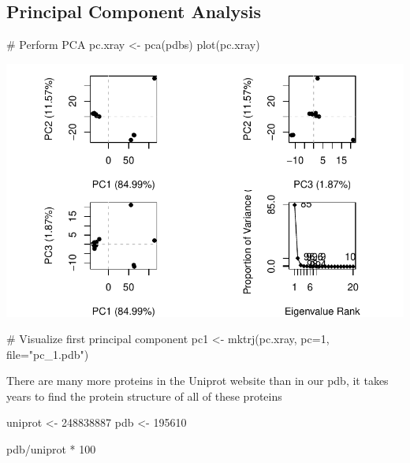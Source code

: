 \documentclass[
  letterpaper,
  DIV=11,
  numbers=noendperiod]{scrartcl}
\newenvironment{Shaded}{\begin{snugshade}}{\end{snugshade}}
\newcommand{\AttributeTok}[1]{\textcolor[rgb]{0.40,0.45,0.13}{#1}}
\newcommand{\CommentTok}[1]{\textcolor[rgb]{0.37,0.37,0.37}{#1}}
\newcommand{\DecValTok}[1]{\textcolor[rgb]{0.68,0.00,0.00}{#1}}
\newcommand{\FunctionTok}[1]{\textcolor[rgb]{0.28,0.35,0.67}{#1}}
\newcommand{\NormalTok}[1]{\textcolor[rgb]{0.00,0.23,0.31}{#1}}
\newcommand{\OtherTok}[1]{\textcolor[rgb]{0.00,0.23,0.31}{#1}}
\newcommand{\SpecialCharTok}[1]{\textcolor[rgb]{0.37,0.37,0.37}{#1}}
\newcommand{\StringTok}[1]{\textcolor[rgb]{0.13,0.47,0.30}{#1}}
\begin{document}
\subsection{Principal Component
Analysis}\label{principal-component-analysis}

\begin{Shaded}
\begin{Highlighting}[]
\CommentTok{\# Perform PCA}
\NormalTok{pc.xray }\OtherTok{\textless{}{-}} \FunctionTok{pca}\NormalTok{(pdbs)}
\FunctionTok{plot}\NormalTok{(pc.xray)}
\end{Highlighting}
\end{Shaded}

\includegraphics{BIMM143-Lab-9-final_files/figure-pdf/unnamed-chunk-32-1.pdf}

\begin{Shaded}
\begin{Highlighting}[]
\CommentTok{\# Visualize first principal component}
\NormalTok{pc1 }\OtherTok{\textless{}{-}} \FunctionTok{mktrj}\NormalTok{(pc.xray, }\AttributeTok{pc=}\DecValTok{1}\NormalTok{, }\AttributeTok{file=}\StringTok{"pc\_1.pdb"}\NormalTok{)}
\end{Highlighting}
\end{Shaded}

There are many more proteins in the Uniprot website than in our pdb, it
takes years to find the protein structure of all of these proteins

\begin{Shaded}
\begin{Highlighting}[]
\NormalTok{uniprot }\OtherTok{\textless{}{-}} \DecValTok{248838887}
\NormalTok{pdb }\OtherTok{\textless{}{-}} \DecValTok{195610}

\NormalTok{pdb}\SpecialCharTok{/}\NormalTok{uniprot }\SpecialCharTok{*} \DecValTok{100}
\end{Highlighting}
\end{Shaded}
\end{document}
